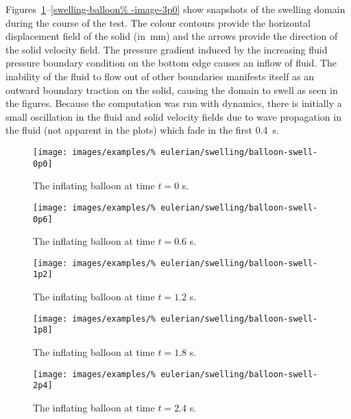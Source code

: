 Figures~\ref{swelling-balloon-image-0p0}--\ref{swelling-balloon%
  -image-3p0} show snapshots of the swelling domain during the course
of the test. The colour contours provide the horizontal displacement
field of the solid (in~mm) and the arrows provide the direction of the
solid velocity field. The pressure gradient induced by the increasing
fluid pressure boundary condition on the bottom edge causes an inflow
of fluid. The inability of the fluid to flow out of other boundaries
manifests itself as an outward boundary traction on the solid, causing
the domain to swell as seen in the figures.  Because the computation
was run with dynamics, there is initially a small oscillation in the
fluid and solid velocity fields due to wave propagation in the fluid
(not apparent in the plots) which fade in the first 0.4~s.

\clearpage

\begin{figure}[!hptb]
  \centering
  \texttt{[image: images/examples/\%
    eulerian/swelling/balloon-swell-0p0]}
  \caption{The inflating balloon at time $t=0$ s.} 
  \label{swelling-balloon-image-0p0}
\end{figure}

\begin{figure}[!hptb]
  \centering
  \texttt{[image: images/examples/\%
    eulerian/swelling/balloon-swell-0p6]}
  \caption{The inflating balloon at time $t=0.6$ s.} 
  \label{swelling-balloon-image-0p6}
\end{figure}

\begin{figure}[!hptb]
  \centering
  \texttt{[image: images/examples/\%
    eulerian/swelling/balloon-swell-1p2]}
  \caption{The inflating balloon at time $t=1.2$ s.} 
  \label{swelling-balloon-image-1p2}
\end{figure}

\begin{figure}[!hptb]
  \centering
  \texttt{[image: images/examples/\%
    eulerian/swelling/balloon-swell-1p8]}
  \caption{The inflating balloon at time $t=1.8$ s.} 
  \label{swelling-balloon-image-1p8}
\end{figure}

\begin{figure}[!hptb]
  \centering
  \texttt{[image: images/examples/\%
    eulerian/swelling/balloon-swell-2p4]}
  \caption{The inflating balloon at time $t=2.4$ s.} 
  \label{swelling-balloon-image-2p4}
\end{figure}

